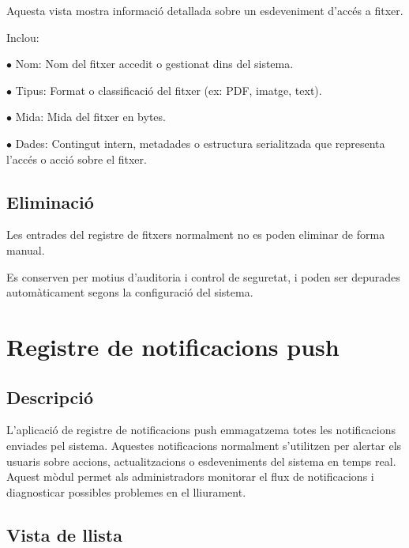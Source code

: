 \documentclass[a4paper]{article}
\begin{document}
Aquesta vista mostra informació detallada sobre un esdeveniment d'accés a fitxer.

Inclou:

\begin{compactitem}
\item[\color{myblue}$\bullet$] Nom: Nom del fitxer accedit o gestionat dins del sistema.
\item[\color{myblue}$\bullet$] Tipus: Format o classificació del fitxer (ex: PDF, imatge, text).
\item[\color{myblue}$\bullet$] Mida: Mida del fitxer en bytes.
\item[\color{myblue}$\bullet$] Dades: Contingut intern, metadades o estructura serialitzada que representa l'accés o acció sobre el fitxer.
\end{compactitem}

\hypertarget{toc20}{}
\subsection{Eliminació}

Les entrades del registre de fitxers normalment no es poden eliminar de forma manual.

Es conserven per motius d'auditoria i control de seguretat, i poden ser depurades automàticament segons la configuració del sistema.


\hypertarget{toc21}{}
\section{Registre de notificacions push}

\hypertarget{toc22}{}
\subsection{Descripció}

L'aplicació de registre de notificacions push emmagatzema totes les notificacions enviades pel sistema.
Aquestes notificacions normalment s'utilitzen per alertar els usuaris sobre accions, actualitzacions o esdeveniments del sistema en temps real.
Aquest mòdul permet als administradors monitorar el flux de notificacions i diagnosticar possibles problemes en el lliurament.

\hypertarget{toc23}{}
\subsection{Vista de llista}
\end{document}
